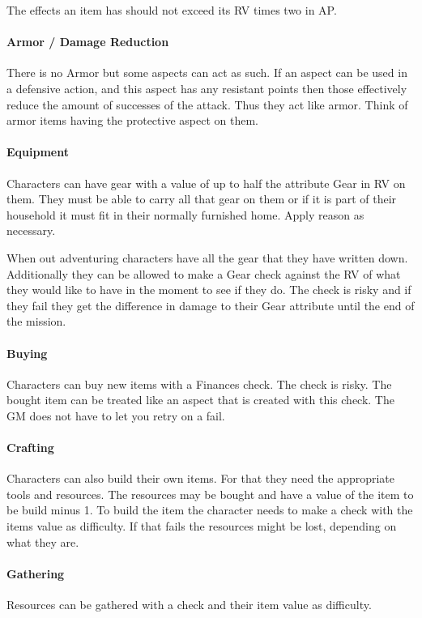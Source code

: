\documentclass[11pt]{article}
\begin{document}
{The effects an item has should not exceed its RV times two in AP.

\paragraph*{Armor / Damage Reduction}
\label{sec:orgbf74a67}
There is no Armor but some aspects can act as such. If an aspect can be used in a defensive action, and this aspect has any resistant points then those effectively reduce the amount of successes of the attack. Thus they act like armor. Think of armor items having the protective aspect on them.

\paragraph*{Equipment}
\label{sec:orgdbf8919}
Characters can have gear with a value of up to half the attribute Gear in RV on them. They must be able to carry all that gear on them or if it is part of their household it must fit in their normally furnished home. Apply reason as necessary.

When out adventuring characters have all the gear that they have written down. Additionally they can be allowed to make a Gear check against the RV of what they would like to have in the moment to see if they do. The check is risky and if they fail they get the difference in damage to their Gear attribute until the end of the mission.

\paragraph*{Buying}
\label{sec:org0df5909}
Characters can buy new items with a Finances check. The check is risky. The bought item can be treated like an aspect that is created with this check. The GM does not have to let you retry on a fail.

\paragraph*{Crafting}
\label{sec:orgbed6b8a}
Characters can also build their own items. For that they need the appropriate tools and resources. The resources may be bought and have a value of the item to be build minus 1. To build the item the character needs to make a check with the items value as difficulty. If that fails the resources might be lost, depending on what they are.

\paragraph*{Gathering}
\label{sec:orgea5f2c2}
Resources can be gathered with a check and their item value as difficulty.

}
\end{document}
